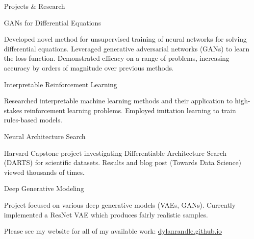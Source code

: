 \documentclass{resume} %
\begin{document}
\begin{rSection}{Projects \& Research}

\begin{rSubsection}{GANs for Differential Equations}{}{}{}

\item Developed novel method for unsupervised training of neural networks for solving differential equations. Leveraged generative adversarial networks (GANs) to learn the loss function. Demonstrated efficacy on a range of problems, increasing accuracy by orders of magnitude over previous methods.

\end{rSubsection}

\begin{rSubsection}{Interpretable Reinforcement Learning}{}{}{}

\item Researched interpretable machine learning methods and their application to high-stakes reinforcement learning problems. Employed imitation learning to train rules-based models. 

\end{rSubsection}

\begin{rSubsection}{Neural Architecture Search}{}{}{}
\item Harvard Capstone project investigating Differentiable Architecture Search (DARTS) for scientific datasets. Results and blog post (Towards Data Science) viewed thousands of times.
\end{rSubsection}

\begin{rSubsection}{Deep Generative Modeling}{}{}{}
\item Project focused on various deep generative models (VAEs, GANs). Currently implemented a ResNet VAE which produces fairly realistic samples.
\end{rSubsection}

Please see my website for all of my available work: \url{dylanrandle.github.io}

\end{rSection}


\end{document}
